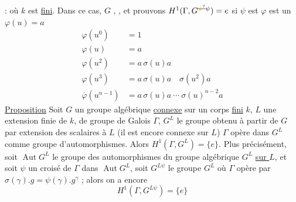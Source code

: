  :  où $k$ est \uline{fini}. Dans ce cas,   $G$  ,  \uline{}, et prouvons $H^1(\Gamma,G^{\deleted{\unsure{\psi}}\psi})=e$ si $\psi$ est
$\varphi$ est un   $\varphi(u)=a$
\[
\begin{aligned}
\varphi(u^0)&=1\\
\varphi(u)&=a\\
\varphi(u^2)&=a\,\sigma(u)a\\
\varphi(u^3)&=a\,\sigma(u)a\quad\sigma(u^2)a\\
\overline\varphi(u^{n-1})&=a\,\sigma(u)a\ \cdots\ \sigma(u)^{n-2}a
\end{aligned}
\]
\uline{Proposition} Soit $G$ un groupe algébrique \uline{connexe} sur un corps \uline{fini} $k$, $L$ une extension finie de $k$, de groupe de Galois $\Gamma$, $G^L$ le groupe obtenu à partir de $G$ par extension des scalaires à $L$ (il est encore connexe sur $L$) $\Gamma$ opère dans $G^L$ comme groupe d'automorphismes.   Alors $H^1(\Gamma,G^L)=\{e\}$. Plus précisément,
soit $\operatorname{Aut}G^L$ le groupe des automorphismes du groupe algébrique $G^L$ \uline{sur $L$}, et soit $\psi$ un  croisé de $\Gamma$ dans $\operatorname{Aut}G^L$, soit $G^{L\psi}$ le groupe $G^L$  où $\Gamma$ opère par $\sigma(\gamma).g=\psi(\gamma).g^\gamma$ ; alors on a encore
\[
H^1(\Gamma,G^{L\psi})=\{e\}
\]

